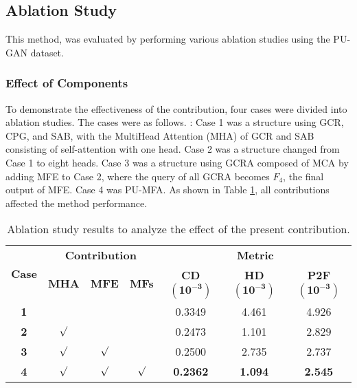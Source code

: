 \documentclass{article}
\begin{document}
\subsection{Ablation Study}
\quad This method, was evaluated by performing various ablation studies using the PU-GAN dataset.

\subsubsection{Effect of Components}
\quad To demonstrate the effectiveness of the contribution, four cases were divided into ablation studies. The cases were as follows. : Case 1 was a structure using GCR, CPG, and SAB, with the MultiHead Attention (MHA) of GCR and SAB consisting of self-attention with one head. Case 2 was a structure changed from Case 1 to eight heads. Case 3 was a structure using GCRA composed of MCA by adding MFE to Case 2, where the query of all GCRA becomes $F_4$, the final output of MFE. Case 4 was PU-MFA. As shown in Table \ref{tab:ablation_components}, all contributions affected the method performance.

\begin{table}[htb!]
\centering
\resizebox{0.5\columnwidth}{!}
{\begin{tabular}{@{}c|ccc|ccc@{}}
\toprule
\multirow{2}{*}{\textbf{Case}} & \multicolumn{3}{c|}{\textbf{Contribution}}  & \multicolumn{3}{c}{\textbf{Metric}}               \\ \cmidrule(l){2-7} 
                               & \textbf{MHA} & \textbf{MFE} & \textbf{MFs} & \textbf{CD$\mathbf{(10^{-3})}$}     & \textbf{HD$\mathbf{(10^{-3})}$}    & \textbf{P2F$\mathbf{(10^{-3})}$}   \\ \midrule
\textbf{1}                     &              &              &               & 0.3349          & 4.461          & 4.926          \\
\textbf{2}                     &$\surd$              &              &               & 0.2473          & 1.101          & 2.829          \\
\textbf{3}                     &$\surd$              &$\surd$              &               & 0.2500          & 2.735          & 2.737          \\ \midrule
\textbf{4}                     &$\surd$              &$\surd$              &$\surd$               & \textbf{0.2362} & \textbf{1.094} & \textbf{2.545} \\ \bottomrule
\end{tabular}}
\caption{Ablation study results to analyze the effect of the present contribution.}
\label{tab:ablation_components}
\end{table}
\end{document}
